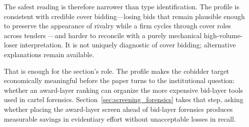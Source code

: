 The safest reading is therefore narrower than type
identification. The profile is consistent with credible cover
bidding---losing bids that remain plausible enough to preserve
the appearance of rivalry while a firm cycles through cover
roles across tenders \citep{asker2010leniency,marshall2012economics}---and
harder to reconcile with a purely mechanical
high-volume-loser interpretation. It is not uniquely diagnostic
of cover bidding; alternative explanations remain available.

That is enough for the section's role. The profile makes the
cobidder target economically meaningful before the paper turns
to the institutional question: whether an award-layer ranking
can organize the more expensive bid-layer tools used in cartel
forensics. Section~\ref{sec:screening_forensics} takes that
step, asking whether placing the award-layer screen ahead of
bid-layer forensics produces measurable savings in evidentiary
effort without unacceptable losses in recall.
